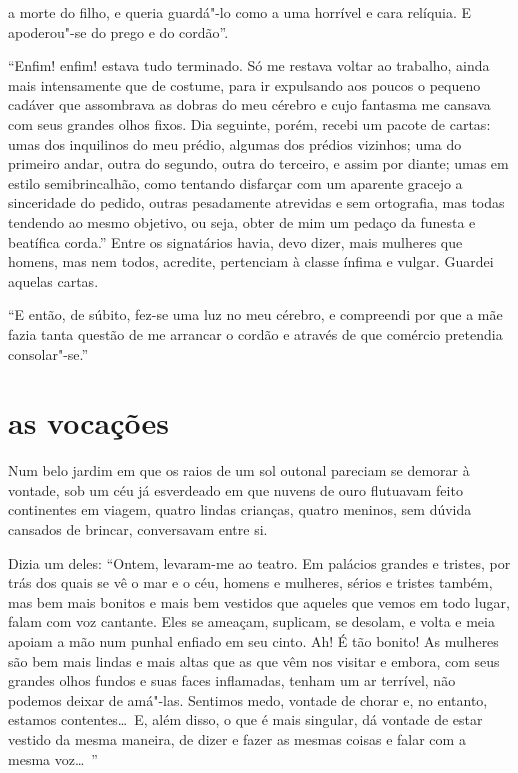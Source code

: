 \quebra

\noindent{}a morte do filho, e queria guardá"-lo
como a uma horrível e cara relíquia. E apoderou"-se do prego e
do cordão''.

“Enfim! enfim! estava tudo terminado. Só me restava voltar
ao trabalho, ainda mais intensamente que de costume, para ir expulsando
aos poucos o pequeno cadáver que assombrava as dobras do meu cérebro
e cujo fantasma me cansava com seus grandes olhos fixos. Dia
seguinte, porém, recebi um pacote de cartas: umas dos inquilinos do meu prédio,
algumas dos prédios vizinhos; uma do primeiro andar, outra do
segundo, outra do terceiro, e assim por diante; umas em estilo
semibrincalhão, como tentando disfarçar com um aparente gracejo a
sinceridade do pedido, outras pesadamente atrevidas e sem ortografia,
mas todas tendendo ao mesmo objetivo, ou seja, obter de mim um pedaço
da funesta e beatífica corda.'' Entre os signatários havia, devo dizer, mais mulheres que homens,
mas nem todos, acredite, pertenciam à classe ínfima e vulgar.
Guardei aquelas cartas.

“E então, de súbito, fez-se uma luz no meu cérebro, e
compreendi por que a mãe fazia tanta questão de me arrancar o cordão e
através de que comércio pretendia consolar"-se.''

\quebra\section[As vocações]{as vocações}

Num belo jardim em que os raios de um sol outonal pareciam se demorar à
vontade, sob um céu já esverdeado em que nuvens de ouro flutuavam feito
continentes em viagem, quatro lindas crianças, quatro meninos, sem
dúvida cansados de brincar, conversavam entre si.

Dizia um deles: “Ontem, levaram-me ao teatro. Em palácios
grandes e tristes, por trás dos quais se vê o mar e o céu, homens e
mulheres, sérios e tristes também, mas bem mais bonitos e mais bem 
vestidos que aqueles que vemos em todo lugar, falam com voz
cantante. Eles se ameaçam, suplicam, se desolam, e volta e meia apoiam
a mão num punhal enfiado em seu cinto. Ah! É tão bonito!
As mulheres são bem mais lindas e mais altas que as que
vêm nos visitar e embora, com seus grandes olhos fundos e suas faces
inflamadas, tenham um ar terrível, não podemos deixar de amá"-las.
Sentimos medo, vontade de chorar e, no entanto, estamos contentes\ldots\  E,
além disso, o que é mais singular, dá vontade de estar vestido da mesma
maneira, de dizer e fazer as mesmas coisas e falar com a mesma
voz\ldots\ ”


